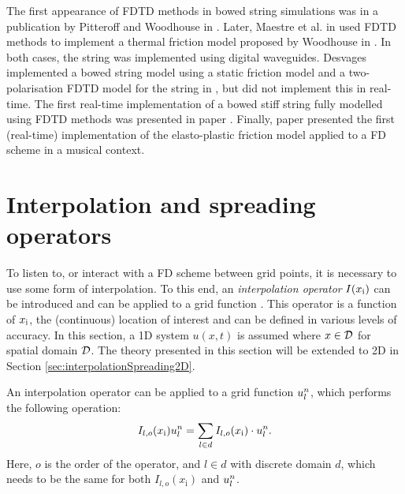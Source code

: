 The first appearance of FDTD methods in bowed string simulations was in a publication by Pitteroff and Woodhouse in \cite{Pitteroff1998}. Later, Maestre et al. in \cite{Maestre2014} used FDTD methods to implement a thermal friction model proposed by Woodhouse in \cite{Woodhouse2003}. In both cases, the string was implemented using digital waveguides. Desvages implemented a bowed string model using a static friction model and a two-polarisation FDTD model for the string in \cite{Desvages2016, Desvages2018}, but did not implement this in real-time. The first real-time implementation of a bowed stiff string fully modelled using FDTD methods was presented in paper \citeP[A]. Finally, paper \citeP[C] presented the first (real-time) implementation of the elasto-plastic friction model applied to a FD scheme in a musical context.

\section{Interpolation and spreading operators}\label{sec:interpolationSpreading}
To listen to, or interact with a FD scheme between grid points, it is necessary to use some form of interpolation. 
To this end, an \textit{interpolation operator} $I(x_{\text{i}})$ can be introduced and can be applied to a grid function \cite{theBible}. This operator is a function of $x_{\text{i}}$, the (continuous) location of interest and can be defined in various levels of accuracy. In this section, a 1D system $u(x,t)$ is assumed where $x\in \mathcal{D}$ for spatial domain $\mathcal{D}$. The theory presented in this section will be extended to 2D in Section \ref{sec:interpolationSpreading2D}.

An interpolation operator can be applied to a grid function $u_l^n$, which performs the following operation:
\begin{equation}
    I_{l,o}(x_{\text{i}})u_l^n = \sum_{l\in d} I_{l,o}(x_{\text{i}})\cdot u_l^n.
\end{equation} 
Here, $o$ is the order of the operator, and $l\in d$ with discrete domain $d$, which needs to be the same for both $I_{l,o}(x_\text{i})$ and $u_l^n$.

